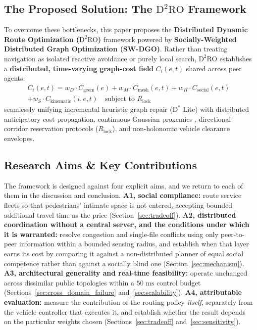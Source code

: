 \documentclass[journal]{IEEEtran}
\begin{document}
\subsection{The Proposed Solution: The \texorpdfstring{$\text{D}^2\text{RO}$}{D2RO} Framework}
To overcome these bottlenecks, this paper proposes the \textbf{Distributed Dynamic Route Optimization (\texorpdfstring{$\text{D}^2\text{RO}$}{D2RO})} framework powered by \textbf{Socially-Weighted Distributed Graph Optimization (SW-DGO)}. Rather than treating navigation as isolated reactive avoidance or purely local search, $\text{D}^2\text{RO}$ establishes a \textbf{distributed, time-varying graph-cost field} $C_i(e, t)$ shared across peer agents:
\begin{multline}
\label{eq:sw_dgo_master_intro}
C_i(e, t) = w_D \cdot C_{\text{geom}}(e) + w_M \cdot C_{\text{mesh}}(e, t) + w_H \cdot C_{\text{social}}(e, t) \\
+ w_S \cdot C_{\text{kinematic}}(i, e, t) \quad \text{subject to } R_{\text{lock}}
\end{multline}
seamlessly unifying incremental heuristic graph repair ($\text{D}^*$ Lite) \cite{koenig2002dstar} with distributed anticipatory cost propagation, continuous Gaussian proxemics \cite{kruse2013human, chen2020relational}, directional corridor reservation protocols ($R_{\text{lock}}$), and non-holonomic vehicle clearance envelopes.

\subsection{Research Aims \& Key Contributions}
\label{sec:aims}
The framework is designed against four explicit aims, and we return to each of them in the discussion and conclusion. \textbf{A1, social compliance:} route service fleets so that pedestrians' intimate space is not entered, accepting bounded additional travel time as the price (Section~\ref{sec:tradeoff}). \textbf{A2, distributed coordination without a central server, and the conditions under which it is warranted:} resolve congestion and single-file conflicts using only peer-to-peer information within a bounded sensing radius, and establish when that layer earns its cost by comparing it against a non-distributed planner of equal social competence rather than against a socially blind one (Section~\ref{sec:mechanism}). \textbf{A3, architectural generality and real-time feasibility:} operate unchanged across dissimilar public topologies within a $50\text{ ms}$ control budget (Sections~\ref{sec:cross_domain_failure} and~\ref{sec:scalability}). \textbf{A4, attributable evaluation:} measure the contribution of the routing policy \emph{itself}, separately from the vehicle controller that executes it, and establish whether the result depends on the particular weights chosen (Sections~\ref{sec:tradeoff} and~\ref{sec:sensitivity}).
\end{document}
